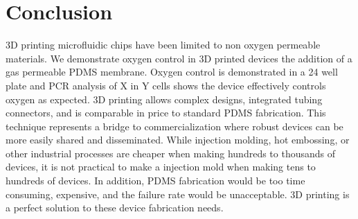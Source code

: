 \documentclass[10pt,letterpaper]{article}
\begin{document}
\section*{Conclusion}
3D printing microfluidic chips have been limited to non oxygen permeable materials. We demonstrate oxygen control in 3D printed devices the addition of a gas permeable PDMS membrane. 
Oxygen control is demonstrated in a 24 well plate and PCR analysis of X in Y cells shows the device effectively controls oxygen as expected. 
3D printing allows complex designs, integrated tubing connectors, and is comparable in price to standard PDMS fabrication. 
This technique represents a bridge to commercialization where robust devices can be more easily shared and disseminated. 
While injection molding, hot embossing, or other industrial processes are cheaper when making hundreds to thousands of devices, it is not practical to make a injection mold when making tens to hundreds of devices. 
In addition, PDMS fabrication would be too time consuming, expensive, and the failure rate would be unacceptable. 3D printing is a perfect solution to these device fabrication needs.

\end{document}
